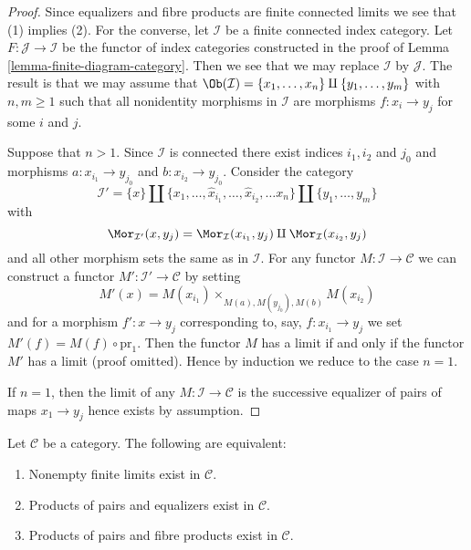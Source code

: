 \begin{proof}
Since equalizers and fibre products are finite connected
limits we see that (1) implies (2). For the converse, let $\mathcal{I}$
be a finite connected index category. Let
$F : \mathcal{J} \to \mathcal{I}$
be the functor of index categories constructed in the proof of
Lemma \ref{lemma-finite-diagram-category}.
Then we see that we may replace $\mathcal{I}$ by $\mathcal{J}$.
The result is that we may assume that
$\Ob(\mathcal{I}) = \{x_1, \ldots, x_n\} \amalg \{y_1, \ldots, y_m\}$
with $n, m \geq 1$ such that all nonidentity morphisms in $\mathcal{I}$
are morphisms $f : x_i \to y_j$ for some $i$ and $j$.

\medskip\noindent
Suppose that $n > 1$. Since $\mathcal{I}$ is connected there
exist indices $i_1, i_2$ and $j_0$ and morphisms $a : x_{i_1} \to y_{j_0}$
and $b : x_{i_2} \to y_{j_0}$. Consider the category
$$
\mathcal{I}' =
\{x\} \amalg \{x_1, \ldots, \hat x_{i_1}, \ldots, \hat x_{i_2}, \ldots x_n\}
\amalg \{y_1, \ldots, y_m\}
$$
with
$$
\Mor_{\mathcal{I}'}(x, y_j) = \Mor_\mathcal{I}(x_{i_1}, y_j)
\amalg \Mor_\mathcal{I}(x_{i_2}, y_j)
$$
and all other morphism sets the same as in $\mathcal{I}$. For any functor
$M : \mathcal{I} \to \mathcal{C}$ we can construct a functor
$M' : \mathcal{I}' \to \mathcal{C}$ by setting
$$
M'(x) = M(x_{i_1}) \times_{M(a), M(y_{j_0}), M(b)} M(x_{i_2})
$$
and for a morphism $f' : x \to y_j$ corresponding to, say,
$f : x_{i_1} \to y_j$ we set $M'(f) = M(f) \circ \text{pr}_1$.
Then the functor $M$ has a limit if and only if the functor $M'$ has
a limit (proof omitted). Hence by induction we reduce to the case $n = 1$.

\medskip\noindent
If $n = 1$, then the limit of any $M : \mathcal{I} \to \mathcal{C}$ is
the successive equalizer of pairs of maps $x_1 \to y_j$ hence
exists by assumption.
\end{proof}

\begin{lemma}
\label{lemma-almost-finite-limits-exist}
Let $\mathcal{C}$ be a category.
The following are equivalent:
\begin{enumerate}
\item Nonempty finite limits exist in $\mathcal{C}$.
\item Products of pairs and equalizers exist in $\mathcal{C}$.
\item Products of pairs and fibre products exist in $\mathcal{C}$.
\end{enumerate}
\end{lemma}

